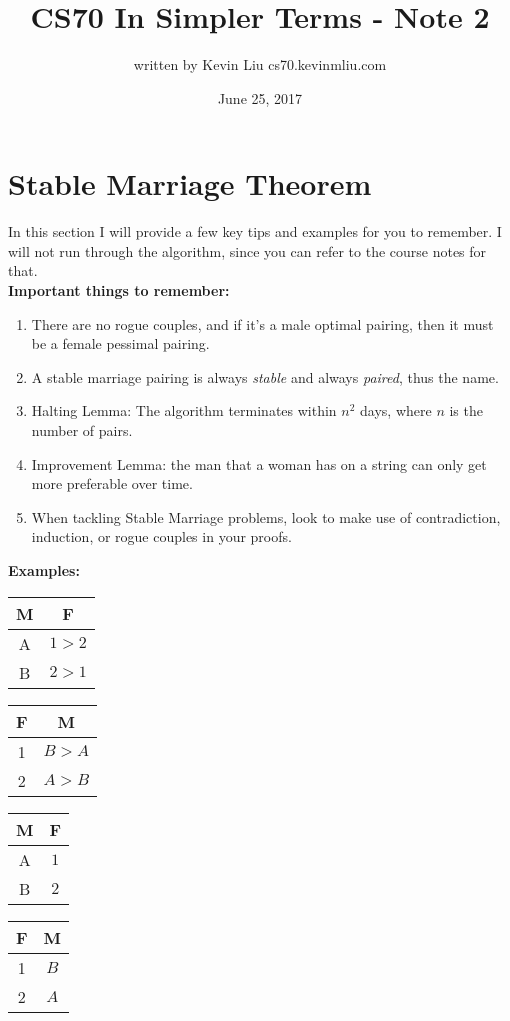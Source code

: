 \documentclass[a4paper]{article}
\title{CS70 In Simpler Terms - Note 2}
\author{written by Kevin Liu cs70.kevinmliu.com}
\date{June 25, 2017}
\begin{document}
\maketitle

\section{Stable Marriage Theorem}
In this section I will provide a few key tips and examples for you to remember. I will not run through the algorithm, since you can refer to the course notes for that.\\ 

\textbf{Important things to remember:}
\begin{enumerate}
	\item There are no rogue couples, and if it's a male optimal pairing, then it must be a female pessimal pairing.
	\item A stable marriage pairing is always \textit{stable} and always \textit{paired}, thus the name.
	\item Halting Lemma: The algorithm terminates within $n^2$ days, where $n$ is the number of pairs. 
	\item Improvement Lemma: the man that a woman has on a string can only get more preferable over time. 
	\item When tackling Stable Marriage problems, look to make use of contradiction, induction, or rogue couples in your proofs.
	
\end{enumerate}

\textbf{Examples:}

\begin{table}[htbp]
    \begin{tabular}[t]{|c|c|}
        \hline
        M & F\\ \hline
        A & $1>2$\\ \hline
        B & $2 >1$\\ \hline
    \end{tabular}
    \hfill
    \begin{tabular}[t]{|c|c|}
        \hline
        F & M\\ \hline
        1 & $B > A$ \\ \hline
        2 & $A > B$\\ \hline  
    \end{tabular}
    \hfill
    \begin{tabular}[t]{|c|c|}
        \hline
        M & F\\ \hline
        A & $1$\\ \hline
        B & $2$\\ \hline  
    \end{tabular}
    \hfill
    \begin{tabular}[t]{|c|c|}
        \hline
        F & M\\ \hline
        1 & $B$ \\ \hline
        2 & $A$\\ \hline  
    \end{tabular}
    \hfill
    \\
\end{table}
\end{document}
